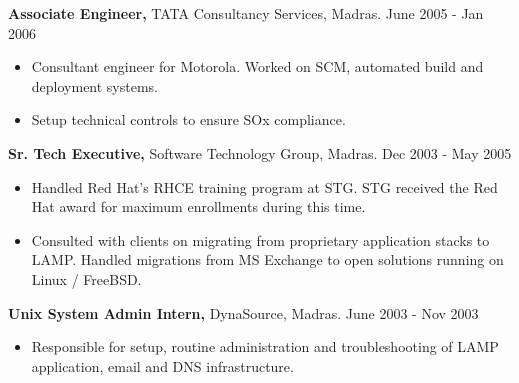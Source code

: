 \documentclass[margin]{res}
\begin{document}
\begin{resume}
\begin{itemize}
 \end{itemize}

 
 
{\bf Associate Engineer,} TATA Consultancy Services, Madras. \hfill June 2005 - Jan 2006
 \begin{itemize} \itemsep -2pt %
 \item Consultant engineer for Motorola. Worked on SCM, automated build and 
   \\ deployment systems.
 \item Setup technical controls to ensure SOx compliance. 

 \end{itemize}

{\bf Sr. Tech Executive,} Software Technology Group, Madras. \hfill Dec 2003 - May 2005
 \begin{itemize} \itemsep -2pt
 \item Handled Red Hat's RHCE training program at STG. STG received the Red Hat
   award for maximum enrollments during this time.
 \item Consulted with clients on migrating from proprietary application stacks
   to LAMP. Handled migrations from MS Exchange to open solutions running on 
   Linux / FreeBSD.
   
 \end{itemize}

{\bf Unix System Admin Intern,} DynaSource, Madras. \hfill June 2003 - Nov 2003
 \begin{itemize} \itemsep -2pt
 \item Responsible for setup, routine administration and troubleshooting 
   of LAMP \\ application, email and DNS infrastructure.
   
 \end{itemize}


\end{resume}
\end{document}
